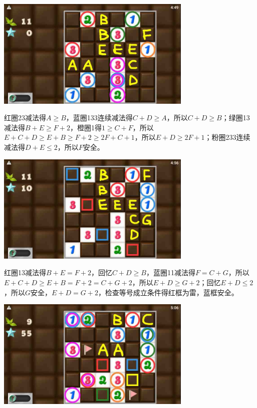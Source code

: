 \subsection{} %
\begin{center}
    \includegraphics[width=0.7\textwidth]{puzzlelow/246-1.jpg}
\end{center}
红圈23减法得$A\ge B$，蓝圈133连续减法得$C+D\ge A$，所以$C+D\ge B$；绿圈13减法得$B+E\ge F+2$，橙圈1得$1\ge C+F$，所以$E+C+D\ge E+B\ge F+2\ge 2F+C+1$，所以$E+D\ge 2F+1$；粉圈233连续减法得$D+E\le 2$，所以$F$安全。
\begin{center}
    \includegraphics[width=0.7\textwidth]{puzzlelow/246-2.jpg}
\end{center}
红圈13减法得$B+E=F+2$，回忆$C+D\ge B$，蓝圈11减法得$F=C+G$，所以$E+C+D\ge E+B=F+2=C+G+2$，所以$E+D\ge G+2$；回忆$E+D\le 2$，所以$G$安全，$E+D=G+2$，检查等号成立条件得红框为雷，蓝框安全。
\begin{center}
    \includegraphics[width=0.7\textwidth]{puzzlelow/246-3.jpg}
\end{center}
